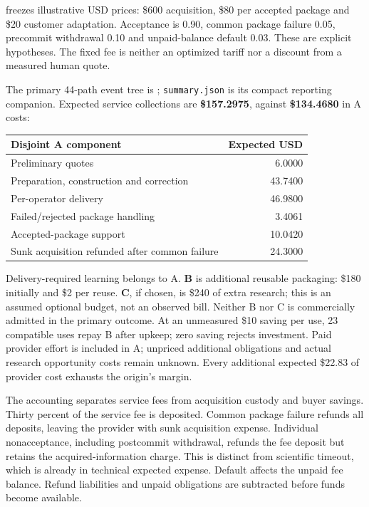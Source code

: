 \documentclass[11pt,letterpaper]{article}
\begin{document}
 freezes illustrative USD prices:
\$600 acquisition, \$80 per accepted package and \$20 customer
adaptation. Acceptance is 0.90, common package failure 0.05, precommit
withdrawal 0.10 and unpaid-balance default 0.03. These are explicit
hypotheses. The fixed fee is neither an optimized tariff nor a discount
from a measured human quote.

The primary 44-path event tree is
; \texttt{summary.json} is its
compact reporting companion. Expected service collections are
\textbf{\$157.2975}, against \textbf{\$134.4680} in A costs:

\begin{longtable}[]{@{}lr@{}}
\toprule\noalign{}
Disjoint A component & Expected USD \\
\midrule\noalign{}
\endhead
\bottomrule\noalign{}
\endlastfoot
Preliminary quotes & 6.0000 \\
Preparation, construction and correction & 43.7400 \\
Per-operator delivery & 46.9800 \\
Failed/rejected package handling & 3.4061 \\
Accepted-package support & 10.0420 \\
Sunk acquisition refunded after common failure & 24.3000 \\
\end{longtable}

Delivery-required learning belongs to A. \textbf{B} is additional
reusable packaging: \$180 initially and \$2 per reuse. \textbf{C}, if
chosen, is \$240 of extra research; this is an assumed optional budget,
not an observed bill. Neither B nor C is commercially admitted in the
primary outcome. At an unmeasured \$10 saving per use, 23 compatible
uses repay B after upkeep; zero saving rejects investment. Paid provider
effort is included in A; unpriced additional obligations and actual
research opportunity costs remain unknown. Every additional expected
\$22.83 of provider cost exhausts the origin's margin.

The accounting separates service fees from acquisition custody and buyer
savings. Thirty percent of the service fee is deposited. Common package
failure refunds all deposits, leaving the provider with sunk acquisition
expense. Individual nonacceptance, including postcommit withdrawal,
refunds the fee deposit but retains the acquired-information charge.
This is distinct from scientific timeout, which is already in technical
expected expense. Default affects the unpaid fee balance. Refund
liabilities and unpaid obligations are subtracted before funds become
available.
\end{document}
